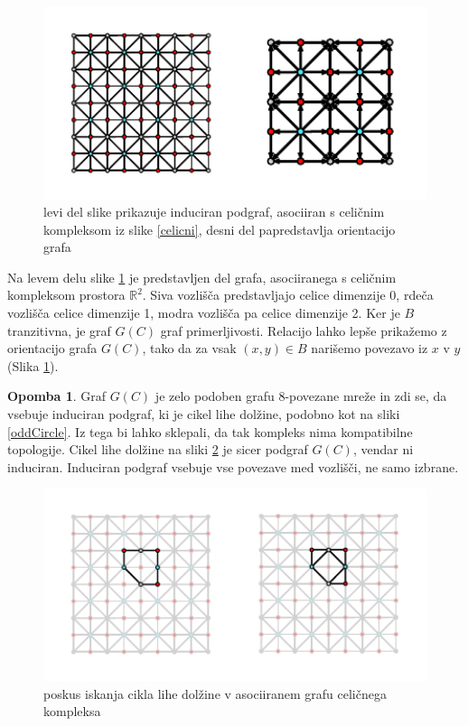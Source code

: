 \documentclass[a4paper, 12pt]{book}
\theoremstyle{definition}
\newtheorem{note}{Opomba}[section]
\theoremstyle{remark}
\begin{document}
\begin{figure}[h]
  \begin{center}
  \includegraphics[width=1\textwidth]{r2-cell-graph.pdf}
  \end{center}
  \caption{levi del slike prikazuje induciran podgraf, asociiran s celičnim kompleksom
  iz slike \ref{celicni}, desni del papredstavlja orientacijo grafa}
  \label{celicni-graf}
\end{figure}
Na levem delu slike \ref{celicni-graf} je predstavljen del grafa, asociiranega s celičnim
kompleksom prostora $\mathbb{R}^2$. Siva vozlišča predstavljajo celice dimenzije 0, rdeča
vozlišča celice dimenzije 1, modra vozlišča pa celice dimenzije 2.
Ker je $B$ tranzitivna, je graf $G(C)$ graf primerljivosti. 
Relacijo lahko lepše prikažemo z orientacijo grafa $G(C)$, tako da za vsak
$(x,y) \in B$ narišemo povezavo iz $x$ v $y$ (Slika \ref{celicni-graf}).
\begin{note}
  Graf $G(C)$ je zelo podoben grafu 8-povezane mreže in zdi se, da vsebuje induciran
  podgraf, ki je cikel lihe dolžine, podobno kot na sliki \ref{oddCircle}. Iz tega
  bi lahko sklepali, da tak kompleks nima kompatibilne topologije. Cikel lihe dolžine
  na sliki \ref{fail-celicni-graf} je sicer podgraf $G(C)$, vendar ni induciran.
  Induciran podgraf vsebuje vse povezave med vozlišči, ne samo izbrane.
\end{note}
\begin{figure}[h]
  \begin{center}
  \includegraphics[width=1\textwidth]{odd-circle-r2-cell.pdf}
  \end{center}
  \caption{poskus iskanja cikla lihe dolžine v asociiranem grafu celičnega kompleksa}
  \label{fail-celicni-graf}
\end{figure}
\end{document}

